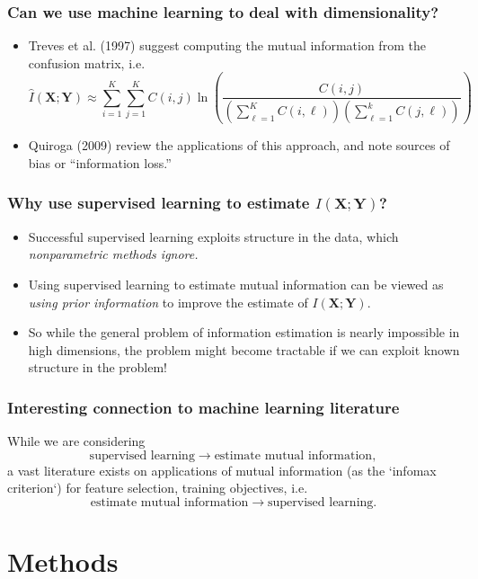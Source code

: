 \documentclass{beamer}
\newcommand{\bX}{\boldsymbol{X}}
\newcommand{\bY}{\boldsymbol{Y}}
\begin{document}
\begin{frame}
\frametitle{Can we use machine learning to deal with dimensionality?}
\begin{itemize}
\item Treves et al. (1997) suggest computing the mutual information from the confusion matrix,
i.e.
\[
\hat{I}(\bX; \bY) \approx \sum_{i=1}^K \sum_{j = 1}^K C(i, j) \ln\left(\frac{C(i, j)}{\left(\sum_{\ell=1}^K C(i, \ell)\right) \left(\sum_{\ell=1}^k C(j, \ell) \right)}\right)
\]
\item Quiroga (2009) review the applications of this approach, and note sources of bias or ``information loss.''
\end{itemize}
\end{frame}

\begin{frame}
\frametitle{Why use supervised learning to estimate $I(\bX; \bY)$?}

\begin{itemize}
\item Successful supervised learning exploits structure in the data, which \emph{nonparametric methods ignore.}
\item Using supervised learning to estimate mutual information can be viewed as \emph{using prior information} to improve the estimate of $I(\bX; \bY)$.
\item So while the general problem of information estimation is nearly impossible in high dimensions,
the problem might become tractable if we can exploit known structure in the problem!
\end{itemize}
\end{frame}

\begin{frame}
\frametitle{Interesting connection to machine learning literature}

While we are considering
\[
\text{supervised learning} \to \text{estimate mutual information},
\]
a vast literature exists on applications of mutual information (as the `infomax criterion`) for feature selection, training objectives, i.e.
\[
\text{estimate mutual information} \to \text{supervised learning}.
\]
\end{frame}

\section{Methods}
\end{document}
